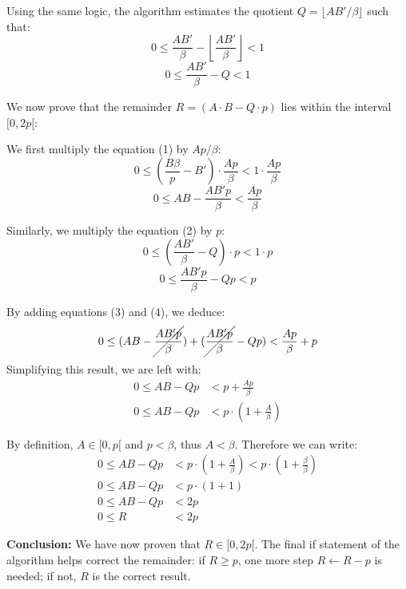 \documentclass{article}
\newcommand{\pointlabel}[1]{\par\smallskip\noindent\textbf{\textcolor{accentorange}{#1:}} }
\begin{document}
Using the same logic, the algorithm estimates the quotient $Q = \lfloor AB'/\beta \rfloor$  such that:
\[0 \le \frac{AB'}{\beta} - \left\lfloor\frac{AB'}{\beta}\right\rfloor < 1\]
\begin{equation}
    0 \le \frac{AB'}{\beta} - Q < 1
\end{equation}

We now prove that the remainder $R = (A \cdot B -Q \cdot p)$ lies within the interval $[0, 2p[$:

We first multiply the equation (1) by $Ap/\beta$:
\[0 \le \left( \frac{B\beta}{p} - B' \right) \cdot \frac{Ap}{\beta} < 1 \cdot \frac{Ap}{\beta}\]
\begin{equation}
    0 \le AB - \frac{AB'p}{\beta} < \frac{Ap}{\beta}
\end{equation}

Similarly, we multiply the equation (2) by $p$:
\[0 \le \left( \frac{AB'}{\beta} - Q \right) \cdot p < 1 \cdot p\]
\begin{equation}
    0 \le \frac{AB'p}{\beta} - Qp < p
\end{equation}

By adding equations (3) and (4), we deduce:
\[0 \le (AB - \cancel{\frac{AB'p}{\beta}}) + (\cancel{\frac{AB'p}{\beta}} - Qp) < \frac{Ap}{\beta} + p\]
Simplifying this result, we are left with:
\begin{align*}
    0 \le AB - Qp & < p + \frac{Ap}{\beta}          \\
    0 \le AB - Qp & < p \cdot (1 + \frac{A}{\beta})
\end{align*}

By definition, $A \in [0, p[$ and $p < \beta$, thus $A < \beta$. Therefore we can write:
\begin{align*}
    0 \le AB - Qp & < p \cdot (1 + \frac{A}{\beta}) < p\cdot (1 + \frac{\beta}{\beta}) \\
    0 \le AB - Qp & < p \cdot (1 + 1)                                                  \\
    0 \le AB - Qp & < 2p                                                               \\
    0 \le R       & < 2p
\end{align*}

\pointlabel{Conclusion}
We have now proven that $R \in [0, 2p[$. The final if statement of the algorithm helps correct the remainder: if $R \ge p$, one more step $R\leftarrow R - p$ is needed; if not, $R$ is the correct result.

\newpage
\end{document}
